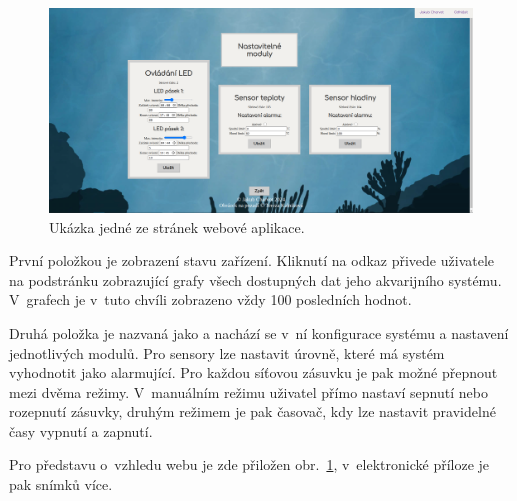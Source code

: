         \begin{figure}[h!]
            \centering
            \includegraphics[width=\textwidth]{obrazky/web.png}
            \caption{Ukázka jedné ze stránek webové aplikace.}
            \label{fig:obrazky-web.png}
        \end{figure}
        
        První položkou je zobrazení stavu zařízení. Kliknutí na odkaz přivede uživatele na podstránku zobrazující grafy všech dostupných dat jeho akvarijního systému. V~grafech je v~tuto chvíli zobrazeno vždy 100 posledních hodnot. 


        Druhá položka je nazvaná jako  a nachází se v~ní konfigurace systému a nastavení jednotlivých modulů. Pro sensory lze nastavit úrovně, které má systém vyhodnotit jako alarmující. Pro každou síťovou zásuvku je pak možné přepnout mezi dvěma režimy. V~manuálním režimu uživatel přímo nastaví sepnutí nebo rozepnutí zásuvky, druhým režimem je pak časovač, kdy lze nastavit pravidelné časy vypnutí a zapnutí.

        Pro představu o~vzhledu webu je zde přiložen obr.~\ref{fig:obrazky-web.png}, v~elektronické příloze je pak snímků více.